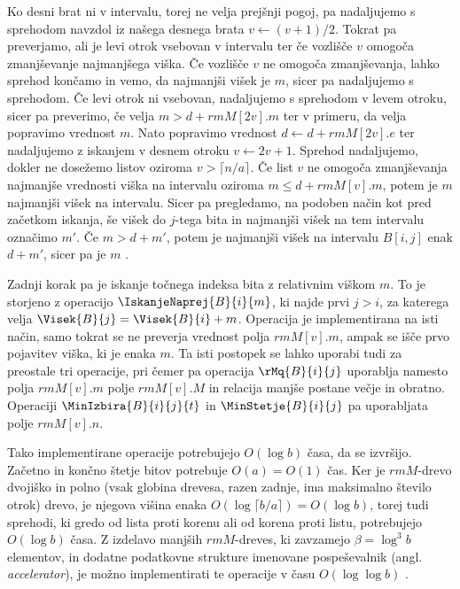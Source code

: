 Ko desni brat ni v intervalu, torej ne velja prejšnji pogoj, pa nadaljujemo s sprehodom navzdol iz našega desnega brata $v\leftarrow (v+1)/2$. Tokrat pa preverjamo, ali je levi otrok vsebovan v intervalu ter če vozlišče $v$ omogoča zmanjševanje najmanjšega viška. Če vozlišče $v$ ne omogoča zmanjševanja, lahko sprehod končamo in vemo, da najmanjši višek je $m$, sicer pa nadaljujemo s sprehodom. Če levi otrok ni vsebovan, nadaljujemo s sprehodom v levem otroku, sicer pa preverimo, če velja $m>d+rmM[2v].m$ ter v primeru, da velja popravimo vrednost $m$. Nato popravimo vrednost $d\leftarrow d+rmM[2v].e$ ter nadaljujemo z iskanjem v desnem otroku $v\leftarrow 2v+1$. Sprehod nadaljujemo, dokler ne dosežemo listov oziroma $v>\lceil n/a\rceil$. Če list $v$ ne omogoča zmanjševanja najmanjše vrednosti viška na intervalu oziroma $m\le d+rmM[v].m$, potem je $m$ najmanjši višek na intervalu. Sicer pa pregledamo, na podoben način kot pred začetkom iskanja, še višek do $j$-tega bita in najmanjši višek na tem intervalu označimo $m'$. Če $m>d+m'$, potem je najmanjši višek na intervalu $B[i,j]$ enak $d+m'$, sicer pa je $m$ \cite{Navarro2016}.

Zadnji korak pa je iskanje točnega indeksa bita z relativnim viškom $m$. To je storjeno z operacijo $\IskanjeNaprej{B}{i}{m}$, ki najde prvi $j> i$, za katerega velja $\Visek{B}{j}=\Visek{B}{i}+m$. Operacija je implementirana na isti način, samo tokrat se ne preverja vrednost polja $rmM[v].m$, ampak se išče prvo pojavitev viška, ki je enaka $m$. Ta isti postopek se lahko uporabi tudi za preostale tri operacije, pri čemer pa operacija $\rMq{B}{i}{j}$ uporablja namesto polja $rmM[v].m$ polje $rmM[v].M$ in relacija manjše postane večje in obratno. Operaciji $\MinIzbira{B}{i}{j}{t}$ in $\MinStetje{B}{i}{j}$ pa uporabljata polje $rmM[v].n$\cite{Navarro2016}.

Tako implementirane operacije potrebujejo $O(\log{b})$ časa, da se izvršijo. Začetno in končno štetje bitov potrebuje $O(a)=O(1)$ čas. Ker je $rmM$-drevo dvojiško in polno (vsak globina drevesa, razen zadnje, ima maksimalno število otrok) drevo, je njegova višina enaka $O(\log{\lceil b/a\rceil})=O(\log{b})$, torej tudi sprehodi, ki gredo od lista proti korenu ali od korena proti listu, potrebujejo $O(\log{b})$ časa. Z izdelavo manjših $rmM$-dreves, ki zavzamejo $\beta=\log^3{b}$ elementov, in dodatne podatkovne strukture imenovane pospeševalnik (angl. \textit{accelerator}), je možno implementirati te operacije v času $O(\log\log{b})$ \cite{Navarro2016}.